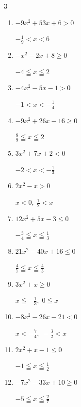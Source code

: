 \begin{multicols}{3}
\begin{enumerate}
        $\displaystyle x \leqq 1 , \; 4 \leqq x$

  \item $-9x^{2}+53x+6>0$

        $\displaystyle -\frac{1}{9} < x < 6$

  \item $-x^{2}-2x+8\geq 0$

        $\displaystyle -4 \leqq x \leqq 2$

  \item $-4x^{2}-5x-1>0$

        $\displaystyle -1 < x < -\frac{1}{4}$

\columnbreak %

\resetques

  \item $-9x^{2}+26x-16\geq 0$

        $\displaystyle \frac{8}{9} \leqq x \leqq 2$

  \item $3x^{2}+7x+2<0$

        $\displaystyle -2 < x < -\frac{1}{3}$

  \item $2x^{2}-x>0$

        $\displaystyle x < 0 , \; \frac{1}{2} < x$

  \item $12x^{2}+5x-3\leq 0$

        $\displaystyle -\frac{3}{4} \leqq x \leqq \frac{1}{3}$

  \item $21x^{2}-40x+16\leq 0$

        $\displaystyle \frac{4}{7} \leqq x \leqq \frac{4}{3}$

  \item $3x^{2}+x\geq 0$

        $\displaystyle x \leqq -\frac{1}{3} , \; 0 \leqq x$

  \item $-8x^{2}-26x-21<0$

        $\displaystyle x < -\frac{7}{4} , \; -\frac{3}{2} < x$

  \item $2x^{2}+x-1\leq 0$

        $\displaystyle -1 \leqq x \leqq \frac{1}{2}$

  \item $-7x^{2}-33x+10\geq 0$

        $\displaystyle -5 \leqq x \leqq \frac{2}{7}$


\end{enumerate}
\end{multicols}
